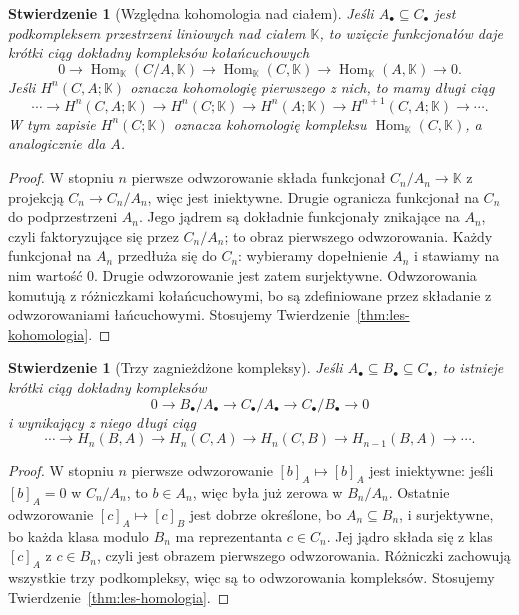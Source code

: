 \documentclass[11pt,a4paper,oneside]{report}
\theoremstyle{plain}
\newtheorem{stwierdzenie}[twierdzenie]{Stwierdzenie}
\theoremstyle{definition}
\theoremstyle{remark}
\begin{document}
\begin{stwierdzenie}[Względna kohomologia nad ciałem]
\label{prop:wzgledna-kohomologia}
Jeśli $A_\bullet\subseteq C_\bullet$
jest podkompleksem przestrzeni liniowych
nad ciałem $\mathbb K$, to wzięcie
funkcjonałów daje krótki ciąg dokładny
kompleksów kołańcuchowych
\[
 0\to\operatorname{Hom}_{\mathbb K}
      (C/A,\mathbb K)
 \to\operatorname{Hom}_{\mathbb K}(C,\mathbb K)
 \to\operatorname{Hom}_{\mathbb K}(A,\mathbb K)
 \to0.
\]
Jeśli $H^n(C,A;\mathbb K)$ oznacza
kohomologię pierwszego z nich, to mamy
długi ciąg
\[
 \cdots\to H^n(C,A;\mathbb K)\to H^n(C;\mathbb K)
 \to H^n(A;\mathbb K)\to H^{n+1}(C,A;\mathbb K)
 \to\cdots .
\]
W tym zapisie $H^n(C;\mathbb K)$
oznacza kohomologię kompleksu
$\operatorname{Hom}_{\mathbb K}(C,\mathbb K)$,
a analogicznie dla $A$.
\end{stwierdzenie}
\begin{proof}
W stopniu $n$ pierwsze odwzorowanie składa
funkcjonał $C_n/A_n\to\mathbb K$
z projekcją $C_n\to C_n/A_n$,
więc jest iniektywne.
Drugie ogranicza funkcjonał na $C_n$
do podprzestrzeni $A_n$.
Jego jądrem są dokładnie funkcjonały
znikające na $A_n$, czyli faktoryzujące
się przez $C_n/A_n$; to obraz
pierwszego odwzorowania. Każdy funkcjonał
na $A_n$ przedłuża się do $C_n$:
wybieramy dopełnienie $A_n$
i stawiamy na nim wartość $0$.
Drugie odwzorowanie jest zatem surjektywne.
Odwzorowania komutują z różniczkami
kołańcuchowymi, bo są zdefiniowane
przez składanie z odwzorowaniami łańcuchowymi.
Stosujemy
Twierdzenie~\ref{thm:les-kohomologia}.
\end{proof}

\begin{stwierdzenie}[Trzy zagnieżdżone kompleksy]
\label{prop:les-potrojny}
Jeśli $A_\bullet\subseteq B_\bullet
\subseteq C_\bullet$, to istnieje
krótki ciąg dokładny kompleksów
\[
 0\longrightarrow B_\bullet/A_\bullet
 \longrightarrow C_\bullet/A_\bullet
 \longrightarrow C_\bullet/B_\bullet
 \longrightarrow0
\]
i wynikający z niego długi ciąg
\[
 \cdots\to H_n(B,A)\to H_n(C,A)\to H_n(C,B)
 \to H_{n-1}(B,A)\to\cdots.
\]
\end{stwierdzenie}
\begin{proof}
W stopniu $n$ pierwsze odwzorowanie
$[b]_A\mapsto[b]_A$ jest iniektywne:
jeśli $[b]_A=0$ w $C_n/A_n$, to
$b\in A_n$, więc była już zerowa w
$B_n/A_n$. Ostatnie odwzorowanie
$[c]_A\mapsto[c]_B$ jest dobrze
określone, bo $A_n\subseteq B_n$,
i surjektywne, bo każda klasa modulo
$B_n$ ma reprezentanta $c\in C_n$.
Jej jądro składa się z klas
$[c]_A$ z $c\in B_n$, czyli jest
obrazem pierwszego odwzorowania.
Różniczki zachowują wszystkie trzy
podkompleksy, więc są to odwzorowania
kompleksów. Stosujemy
Twierdzenie~\ref{thm:les-homologia}.
\end{proof}
\end{document}
